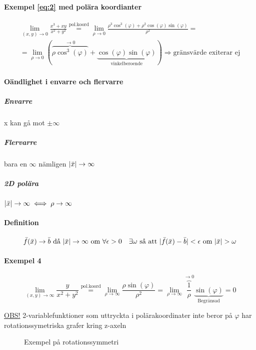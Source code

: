 \documentclass{article}
\DeclarePairedDelimiter \abs{\lvert}{\rvert}
\begin{document}
\paragraph{Exempel \eqref{eq:2} med polära koordianter}

\[
\begin{split}
\lim_{(x,y) \rightarrow 0} \frac{x^3+xy}{x^2+y^2} \overset{\mathrm{pol.koord}}{=} \lim_{\rho \rightarrow 0} \frac{\rho^3 \cos^3(\varphi) + \rho^2 \cos(\varphi) \sin(\varphi)}{\rho^2} = \\
=\lim_{\rho \rightarrow 0} (\overbrace{\rho \cos^3(\varphi)}^{\rightarrow 0}+\underbrace{\cos(\varphi) \sin(\varphi)}_\text{vinkelberoende}) \Rightarrow \text{gränsvärde exiterar ej}
\end{split}
\]

\paragraph{Oändlighet i envarre och flervarre}
\subparagraph*{Envarre}
x kan gå mot $\pm\infty$
\subparagraph*{Flervarre}
bara en $\infty$ nämligen $\abs{\bar{x}} \rightarrow \infty$
\subparagraph*{2D polära}
$\abs{\bar{x}} \rightarrow \infty \iff \rho \rightarrow \infty$
\paragraph{Definition}
\[
	\bar{f}(\bar{x}) \rightarrow \bar{b} \text{ då } \abs{\bar{x}} \rightarrow \infty \text{ om } \forall \epsilon > 0 \quad \exists \omega \text{ så att } \abs{\bar{f}(\bar{x}) - \bar{b}} < \epsilon \text{ om } \abs{\bar{x}} > \omega
\]

\newpage
\paragraph{Exempel 4}

\begin{equation} \label{eq:4}
	\lim_{(x,y) \rightarrow \infty} \frac{y}{x^2+y^2} \overset{\mathrm{pol.koord}}{=} \lim_{\rho \rightarrow \infty} \frac{\rho \sin(\varphi)}{\rho^2} = \lim_{\rho \rightarrow \infty} \overbrace{\frac{1}{\rho}}^{\rightarrow 0} \underbrace{\sin(\varphi)}_\text{Begränsad} = 0
\end{equation}

\underline{OBS!} 2-variablefunktioner som uttryckta i polärakoordinater inte beror på $\varphi$ har rotationssymetriska grafer kring z-axeln

\begin{figure}[ht]
\usetikzlibrary{3d}
\caption{Exempel på rotationssymmetri} \label{fig:3}
\end{figure}
\end{document}
